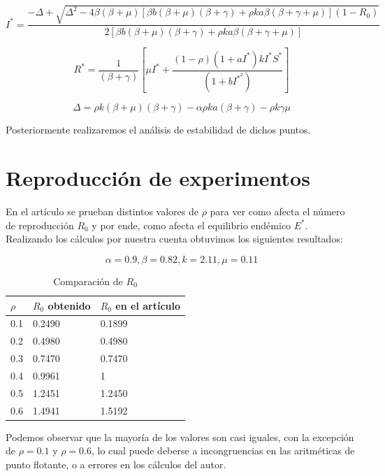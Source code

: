 \documentclass{article}
\begin{document}
\begin{equation}
    I^* = \dfrac{-\Delta + \sqrt{\Delta ^ 2 - 4\beta (\beta + \mu)[\beta b(\beta + \mu)(\beta + \gamma) + \rho ka\beta (\beta + \gamma + \mu)](1-R_0)}}{2[\beta b(\beta + \mu)(\beta + \gamma) + \rho ka\beta (\beta + \gamma + \mu)]}
\end{equation}

\begin{equation}
    R^* = \dfrac{1}{(\beta + \gamma)}\left[\mu I^* + \dfrac{(1-\rho)(1+aI^*)kI^*S^*}{(1+bI^{{*}^2})} \right]
\end{equation}

\begin{equation}
    \Delta = \rho k (\beta + \mu)(\beta + \gamma) - \alpha \rho ka(\beta + \gamma) - \rho k \gamma \mu
\end{equation}

Posteriormente realizaremos el an\'alisis de estabilidad de dichos puntos.

\section{Reproducci\'on de experimentos}

En el art\'iculo se prueban distintos valores de $\rho$ para ver como afecta el n\'umero de reproducci\'on $R_0$ y por ende, como afecta el equilibrio end\'emico $E^*$. Realizando los c\'alculos por nuestra cuenta obtuvimos los siguientes resultados:

$$\alpha=0.9, \beta=0.82, k=2.11, \mu=0.11$$

\begin{table}[H]
    \centering
    \begin{tabular}{|l|l|l|}
    \hline
    $\rho$ & $R_0$ obtenido & $R_0$ en el art\'iculo \\ \hline
    0.1 & 0.2490 & 0.1899 \\ \hline
    0.2 & 0.4980 & 0.4980 \\ \hline
    0.3 & 0.7470 & 0.7470 \\ \hline
    0.4 & 0.9961 & 1 \\ \hline
    0.5 & 1.2451 & 1.2450 \\ \hline
    0.6 & 1.4941 & 1.5192 \\ \hline
    \end{tabular}
    \caption{Comparación de $R_0$}
    \label{tab:r_0_comparison}
\end{table}

Podemos observar que la mayor\'ia de los valores son casi iguales, con la excepci\'on de $\rho=0.1$ y $\rho=0.6$, lo cual puede deberse a incongruencias en las aritm\'eticas de punto flotante, o a errores en los c\'alculos del autor.
\end{document}
